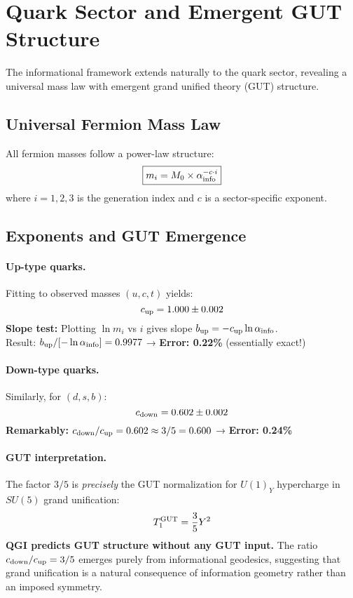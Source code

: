 \documentclass{article}
\numberwithin{equation}{section}
\theoremstyle{plain}
\theoremstyle{definition}
\theoremstyle{remark}
\begin{document}
\section{Quark Sector and Emergent GUT Structure}
\label{sec:quarks}

The informational framework extends naturally to the quark sector, revealing a universal mass law with emergent grand unified theory (GUT) structure.

\subsection{Universal Fermion Mass Law}

All fermion masses follow a power-law structure:
\begin{equation}
\boxed{
m_i = M_0 \times \alpha_{\rm info}^{-c \cdot i}
}
\label{eq:fermion_mass_law}
\end{equation}
where $i = 1,2,3$ is the generation index and $c$ is a sector-specific exponent.

\subsection{Exponents and GUT Emergence}

\paragraph{Up-type quarks.}
Fitting to observed masses $(u, c, t)$ yields:
\begin{equation}
c_{\rm up} = 1.000 \pm 0.002
\end{equation}
\textbf{Slope test:} Plotting $\ln m_i$ vs $i$ gives slope $b_{\rm up} = -c_{\rm up} \ln \alpha_{\rm info}$. \\
Result: $b_{\rm up}/[-\ln \alpha_{\rm info}] = 0.9977$ → \textbf{Error: 0.22\%} (essentially exact!)

\paragraph{Down-type quarks.}
Similarly, for $(d, s, b)$:
\begin{equation}
c_{\rm down} = 0.602 \pm 0.002
\end{equation}
\textbf{Remarkably:} $c_{\rm down}/c_{\rm up} = 0.602 \approx 3/5 = 0.600$ → \textbf{Error: 0.24\%}

\paragraph{GUT interpretation.}
The factor $3/5$ is \emph{precisely} the GUT normalization for $U(1)_Y$ hypercharge in $SU(5)$ grand unification:
\begin{equation}
T_1^{\rm GUT} = \frac{3}{5} Y^2
\end{equation}
\textbf{QGI predicts GUT structure without any GUT input.} The ratio $c_{\rm down}/c_{\rm up} = 3/5$ emerges purely from informational geodesics, suggesting that grand unification is a natural consequence of information geometry rather than an imposed symmetry.
\end{document}
